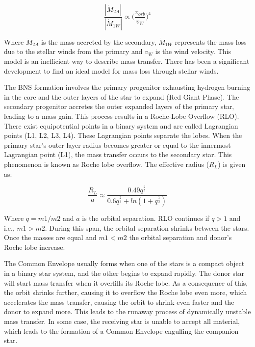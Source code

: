 \documentclass[preprint,12pt]{elsarticle}
\begin{document}
\begin{equation}
    \frac{|\Dot{M}_{2A}|}{|\Dot{M}_{1W}|} \propto \Big(\frac{v_{orb}}{v_W}\Big)^4
\end{equation}

Where $\Dot{M}_{2A}$ is the mass accreted by the secondary, $\Dot{M}_{1W}$ represents the mass loss due to the stellar winds from the primary and $v_W$ is the wind velocity. This model is an inefficient way to describe mass transfer. There has been a significant development to find an ideal model for mass loss through stellar winds.\newline


\newline
The BNS formation involves the primary progenitor exhausting hydrogen burning in the core and the outer layers of the star to expand (Red Giant Phase). The secondary progenitor accretes the outer expanded layers of the primary star, leading to a mass gain. This process results in a Roche-Lobe Overflow (RLO). There exist equipotential points in a binary system and are called Lagrangian points (L1, L2, L3, L4). These Lagrangian points separate the lobes. When the primary star's outer layer radius becomes greater or equal to the innermost Lagrangian point (L1), the mass transfer occurs to the secondary star. This phenomenon is known as Roche lobe overflow. The effective radius ($R_L$) is given as\citep{Eggleton:2006}:

\begin{equation}
    \frac{R_L}{a}\approx\frac{0.49q^\frac{2}{3}}{0.6q^\frac{2}{3}+ln(1+q^\frac{1}{3})}
\end{equation}

Where $q=m1/m2$ and $a$ is the orbital separation. RLO continues if $q>1$ and i.e., $m1>m2$. During this span, the orbital separation shrinks between the stars. Once the masses are equal and $m1<m2$ the orbital separation and donor's Roche lobe increase.\newline


\newline
The Common Envelope usually forms when one of the stars is a compact object in a binary star system, and the other begins to expand rapidly\citep{Iben:1993}. The donor star will start mass transfer when it overfills its Roche lobe. As a consequence of this, the orbit shrinks further, causing it to overflow the Roche lobe even more, which accelerates the mass transfer, causing the orbit to shrink even faster and the donor to expand more. This leads to the runaway process of dynamically unstable mass transfer. In some case, the receiving star is unable to accept all material, which leads to the formation of a Common Envelope engulfing the companion star\citep{Ivanova:2013}.\newline
\end{document}
